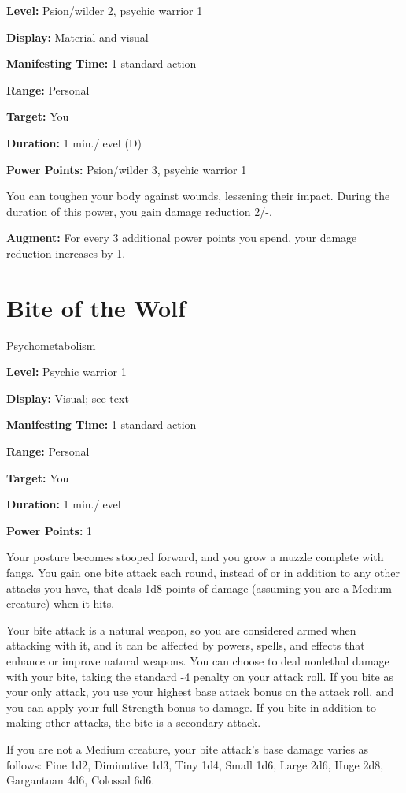 \documentclass{article}
\begin{document}
\textbf{Level:} Psion/wilder 2, psychic warrior 1

\textbf{Display:} Material and visual

\textbf{Manifesting Time:} 1 standard action

\textbf{Range:} Personal

\textbf{Target:} You

\textbf{Duration:} 1 min./level (D)

\textbf{Power Points:} Psion/wilder 3, psychic warrior 1

You can toughen your body against wounds, lessening their impact. During the duration 
of this power, you gain damage reduction 2/-.

\textbf{Augment:} For every 3 additional power points you spend, your damage reduction 
increases by 1.

\vspace{12pt}
\section*{Bite of the Wolf}

Psychometabolism

\textbf{Level:} Psychic warrior 1

\textbf{Display:} Visual; see text

\textbf{Manifesting Time:} 1 standard action

\textbf{Range:} Personal

\textbf{Target:} You

\textbf{Duration:} 1 min./level

\textbf{Power Points:} 1

Your posture becomes stooped forward, and you grow a muzzle complete with fangs. 
You gain one bite attack each round, instead of or in addition to any other attacks 
you have, that deals 1d8 points of damage (assuming you are a Medium creature) 
when it hits.

Your bite attack is a natural weapon, so you are considered armed when attacking 
with it, and it can be affected by powers, spells, and effects that enhance or 
improve natural weapons. You can choose to deal nonlethal damage with your bite, 
taking the standard -4 penalty on your attack roll. If you bite as your only attack, 
you use your highest base attack bonus on the attack roll, and you can apply your 
full Strength bonus to damage. If you bite in addition to making other attacks, 
the bite is a secondary attack.

If you are not a Medium creature, your bite attack's base damage varies as follows: 
Fine 1d2, Diminutive 1d3, Tiny 1d4, Small 1d6, Large 2d6, Huge 2d8, Gargantuan 
4d6, Colossal 6d6.
\end{document}
